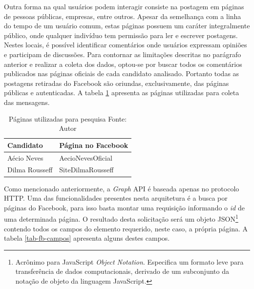 Outra forma na qual usuários podem interagir consiste na postagem em páginas de pessoas públicas, empresas, entre outros. Apesar da semelhança com a linha do tempo de um usuário comum, estas páginas possuem um caráter integralmente público, onde qualquer indivíduo tem permissão para ler e escrever postagens. Nestes locais, é possível identificar comentários onde usuários expressam opiniões e participam de discussões. Para contornar as limitações descritas no parágrafo anterior e realizar a coleta dos dados, optou-se por buscar todos os comentários publicados nas páginas oficiais de cada candidato analisado. Portanto todas as postagens retiradas do Facebook são oriundas, exclusivamente, das páginas públicas e autenticadas. A tabela \ref{tab-fb-pags} apresenta as páginas utilizadas para coleta das mensagens.	

\begin{table}[!ht]
\begin{center}
  \begin{tabular}{|p{5cm}|p{5cm}|}
	\hline
	Candidato & Página no Facebook
	\\ \hline
	Aécio Neves & AecioNevesOficial
	\\ \hline
	Dilma Rousseff & SiteDilmaRousseff
	\\ \hline
  \end{tabular}
  \captionsetup{justification=centering}
  \caption[Páginas utilizadas para pesquisa]{Páginas utilizadas para pesquisa
  \protect\linebreak Fonte: Autor}
\label{tab-fb-pags}
\end{center}
\end{table}
\FloatBarrier

Como mencionado anteriormente, a \textit{Graph} API é baseada apenas no protocolo HTTP. Uma das funcionalidades presentes nesta arquitetura é a busca por páginas do Facebook, para isso basta montar uma requisição informando o \textit{id} de uma determinada página. O resultado desta solicitação será um objeto JSON\footnote{Acrônimo para JavaScript \textit{Object Notation}. Especifica um formato leve para transferência de dados computacionais, derivado de um subconjunto da notação de objeto da linguagem JavaScript.} contendo todos os campos do elemento requerido, neste caso, a própria página. A tabela \ref{tab-fb-campos} apresenta alguns destes campos.

